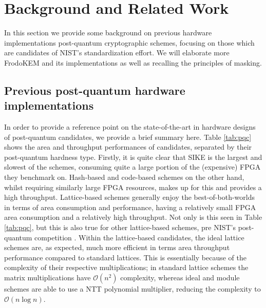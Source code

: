 \section{Background and Related Work} \label{sec:related}
  
In this section we provide some background on previous hardware implementations post-quantum cryptographic schemes, focusing on those which are candidates of NIST's standardization effort. We will elaborate more FrodoKEM and its implementations as well as recalling the principles of masking.

\subsection{Previous post-quantum hardware implementations}

In order to provide a reference point on the state-of-the-art in hardware designs of post-quantum candidates, we provide a brief summary here. Table \ref{tab:pqc} shows the area and throughput performances of candidates, separated by their post-quantum hardness type. Firstly, it is quite clear that SIKE is the largest and slowest of the schemes, consuming quite a large portion of the (expensive) FPGA they benchmark on. Hash-based and code-based schemes on the other hand, whilst requiring similarly large FPGA resources, makes up for this and provides a high throughput. Lattice-based schemes generally enjoy the best-of-both-worlds in terms of area consumption and performance, having a relatively small FPGA area consumption and a relatively high throughput. Not only is this seen in Table \ref{tab:pqc}, but this is also true for other lattice-based schemes, pre NIST's post-quantum competition \cite{DBLP:conf/ches/PoppelmannDG14,roy2014compact,howe2016lattice}. Within the lattice-based candidates, the ideal lattice schemes are, as expected, much more efficient in terms area throughput performance compared to standard lattices. This is essentially because of the complexity of their respective multiplications; in standard lattice schemes the matrix multiplications have $ \mathcal{O}(n^2)$ complexity, whereas ideal and module schemes are able to use a NTT polynomial multiplier, reducing the complexity to $ \mathcal{O}(n\log n)$.

